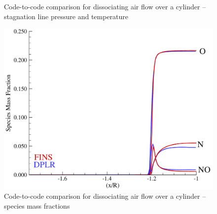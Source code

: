 \begin{figure}[hbtp]
  \begin{center}
    \caption{Code-to-code comparison for dissociating air flow over a cylinder -- stagnation line pressure and temperature}
  \end{center}
\end{figure}


\begin{figure}[hbtp]
  \begin{center}
    \includegraphics[width=\textwidth]{figures/cyl_5sp_air/fins_dplr_massfracs_comp}
    \caption{Code-to-code comparison for dissociating air flow over a cylinder -- species mass fractions}
  \end{center}
\end{figure}




